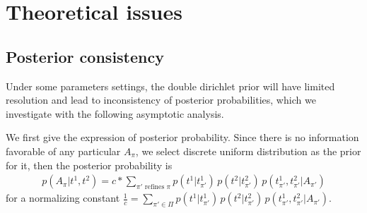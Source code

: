 \documentclass[aoas,preprint]{imsart}
\begin{document}



\section{Theoretical issues}
\subsection{Posterior consistency}
Under some parameters settings, the double dirichlet prior will have limited resolution and lead to inconsistency of posterior probabilities, which we investigate with the following asymptotic analysis.

We first give the expression of posterior probability. Since there is no information favorable of any particular $A_\pi$, we select discrete uniform distribution as the prior for it, then the posterior probability is
\begin{align}
p(A_\pi | t^1, t^2) = c*\sum_{\pi' \text{ refines } \pi} p(t^1 | t^1_{\pi'})\, p(t^2 |  t^2_{\pi'} )
 \, p( t^1_{\pi'}, t^2_{\pi'} | A_{\pi'} )
\end{align}
for a normalizing constant $\frac{1}{c} = \underset{\pi' \in \Pi}\sum p(t^1 | t^1_{\pi'})\, p(t^2|  t^2_{\pi'} )
 \, p( t^1_{\pi'}, t^2_{\pi'} | A_{\pi'} )$.
 
\end{document}
